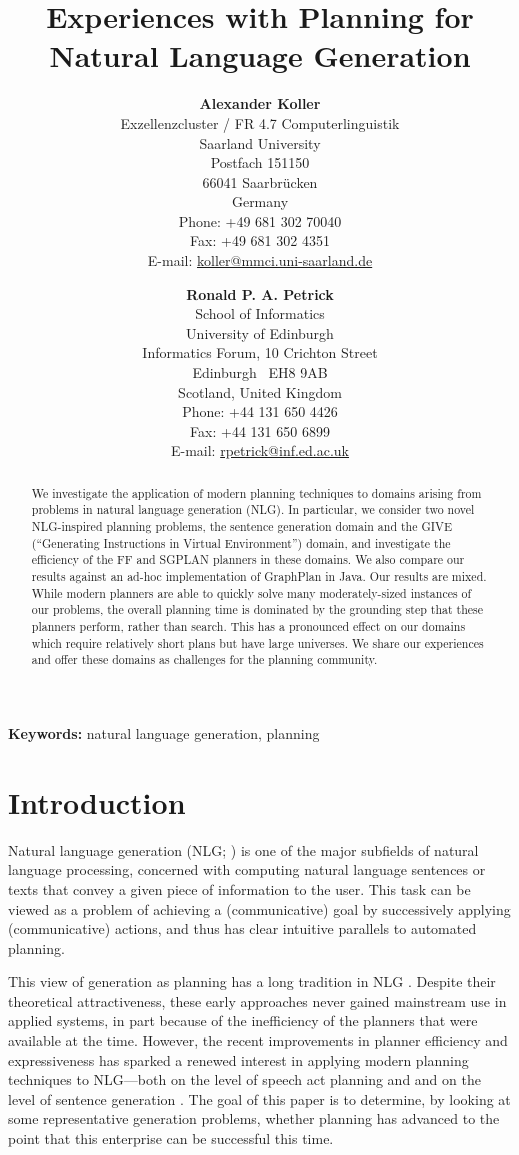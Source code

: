 \documentclass[letterpaper]{article}
\title{Experiences with Planning for Natural Language Generation}
\author{\textbf{Alexander Koller} \\
Exzellenzcluster / FR 4.7 Computerlinguistik \\
Saarland University \\
Postfach 151150 \\
66041 Saarbr\"ucken \\
Germany \\
Phone: +49 681 302 70040 \\
Fax: +49 681 302 4351 \\
E-mail: \url{koller@mmci.uni-saarland.de}
\and
\textbf{Ronald P. A. Petrick} \\
School of Informatics \\
University of Edinburgh \\
Informatics Forum, 10 Crichton Street \\
Edinburgh \ EH8 9AB \\
Scotland, United Kingdom \\
Phone: +44 131 650 4426 \\
Fax: +44 131 650 6899 \\
E-mail: \url{rpetrick@inf.ed.ac.uk}}
\date{}
\begin{document}
\maketitle


\pagebreak
\begin{abstract}
We investigate the application of modern planning techniques to domains
arising from problems in natural language generation (NLG). In particular,
we consider two novel NLG-inspired planning problems, the sentence
generation domain and the GIVE (``Generating Instructions in Virtual
Environment'') domain, and investigate the efficiency of the FF and SGPLAN
planners in these domains. We also compare our results against an ad-hoc
implementation of GraphPlan in Java. Our results are mixed. While modern
planners are able to quickly solve many moderately-sized instances of our
problems, the overall planning time is dominated by the grounding step that
these planners perform, rather than search. This has a pronounced effect on
our domains which require relatively short plans but have large universes.
We share our experiences and offer these domains as challenges for the
planning community.
\end{abstract}

\bigskip\noindent
\textbf{Keywords:} natural language generation, planning


\pagebreak
\section{Introduction}
\label{sec:introduction}

Natural language generation (NLG; \citealp{reiter00building}) is one
of the major subfields of natural language processing, concerned with
computing natural language sentences or texts that convey a given
piece of information to the user. This task can be viewed as a problem
of achieving a (communicative) goal by successively applying
(communicative) actions, and thus has clear intuitive parallels to
automated planning.

This view of generation as planning has a long tradition in NLG
\citep{perrault80,appelt:planning,hovy88,young94dpocl}. Despite their
theoretical attractiveness, these early approaches never gained
mainstream use in applied systems, in part because of the inefficiency
of the planners that were available at the time. However, the recent
improvements in planner efficiency and expressiveness has sparked a
renewed interest in applying modern planning techniques to NLG---both
on the level of speech act planning
\citep{Steedman-Petrick:07,benotti08b} and and on the level of
sentence generation \citep{KolSto07}. The goal of this paper is to
determine, by looking at some representative generation problems,
whether planning has advanced to the point that this enterprise can be
successful this time.
\end{document}
